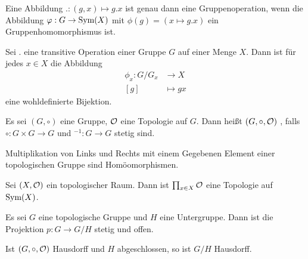 \documentclass{report}
\begin{document}
\begin{lemma}
	Eine Abbildung $. : (g,x) \mapsto g.x$ ist genau dann eine Gruppenoperation, wenn die Abbildung $\varphi : G \to \textnormal{Sym}(X)$ mit $\phi(g) = (x \mapsto g.x)$ ein Gruppenhomomorphismus ist.
\end{lemma}
\begin{lemma}
	Sei $.$ eine transitive Operation einer Gruppe $G$ auf einer Menge $X$. Dann ist für jedes $x \in X$ die Abbildung
	\begin{align*}
		\phi_x : G/G_x &\to X\\
		[g] &\mapsto gx
	\end{align*}
	eine wohldefinierte Bijektion.
\end{lemma}
\begin{definition}
	Es sei $(G, \circ)$ eine Gruppe, $\mathcal{O}$ eine Topologie auf $G$. Dann heißt $(G, \circ, \mathcal{O})$ , falls $\circ : G \times G \to G$ und $^{-1} : G \to G$ stetig sind.
\end{definition}
\begin{corollary}
	Multiplikation von Links und Rechts mit einem Gegebenen Element einer topologischen Gruppe sind Homöomorphismen.
\end{corollary}
\begin{proposition}
	Sei $(X, \mathcal{O})$ ein topologischer Raum. Dann ist $\prod_{x \in X} \mathcal{O}$ eine Topologie auf $\textnormal{Sym}(X)$.
\end{proposition}
\begin{theorem}
	Es sei $G$ eine topologische Gruppe und $H$ eine Untergruppe. Dann ist die Projektion $p : G \to G/H$ stetig und offen.
\end{theorem}
\begin{theorem}
	Ist $(G, \circ, \mathcal{O})$ Hausdorff und $H$ abgeschlossen, so ist $G/H$ Hausdorff.
\end{theorem}
\end{document}
